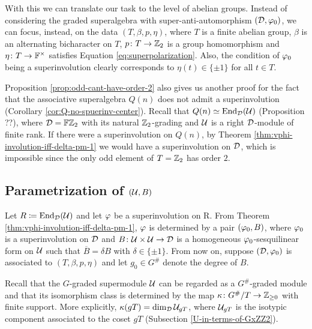 With this we can translate our task to the level of abelian groups. 
Instead of considering the graded superalgebra with super-anti-automorphism $(\mathcal{D}, \varphi_0)$, we can focus, instead, on the data $(T, \beta, p, \eta)$, where $T$ is a finite abelian group, $\beta$ is an alternating bicharacter on $T$, $p\colon T \to \mathbb{Z}_2$ is a group homomorphism and $\eta\colon T \to \mathbb{F}^\times$ satisfies Equation \eqref{eq:superpolarization}. 
Also, the condition of $\varphi_0$ being a superinvolution clearly corresponds to $\eta(t) \in \{ \pm 1 \}$ for all $t\in T$.



\begin{remark}
    Proposition \ref{prop:odd-cant-have-order-2} also gives us another proof for the fact that the associative superalgebra $Q(n)$ does not admit a superinvolution (Corollary \ref{cor:Q-no-spuerinv-center}). 
    Recall that $Q(n) \simeq \operatorname{End}_{\mathcal{D}} (\mathcal U)$ (Proposition ??), where $\mathcal{D}= \mathbb{F}\mathbb{Z}_2$ with its natural $\mathbb{Z}_2$-grading and $\mathcal U$ is a right $\mathcal{D}$-module of finite rank. 
    If there were a superinvolution on $Q(n)$, by Theorem \ref{thm:vphi-involution-iff-delta-pm-1} we would have a superinvolution on $\mathcal{D}$, which is impossible since the only odd element of $T = \mathbb{Z}_2$ has order $2$. 
\end{remark}


\subsection{Parametrization of $(\mathcal U, B)$}

Let $R \coloneqq \operatorname{End}_{\mathcal{D}} (\mathcal U)$ and let $\varphi$ be a superinvolution on R. 
From Theorem \ref{thm:vphi-involution-iff-delta-pm-1}, $\varphi$ is determined by a pair $(\varphi_0, B)$, where $\varphi_0$ is a superinvolution on $\mathcal{D}$ and $B\colon \mathcal U \times \mathcal U \to \mathcal{D}$ is a homogeneous $\varphi_0$-sesquilinear form on $\mathcal U$ such that $\overline B = \delta B$ with $\delta \in \{ \pm 1 \}$. 
From now on, suppose $(\mathcal{D}, \varphi_0)$ is associated to $(T, \beta, p, \eta)$ and let $g_0\in G^\#$ denote the degree of $B$. 

Recall that the $G$-graded supermodule $\mathcal U$ can be regarded as a $G^\#$-graded module 
and that its isomorphism class is determined by the map $\kappa\colon G^\#/T \to \mathbb{Z}_{\geq 0}$ with finite support. 
More explicitly, $\kappa (gT) = \dim_{\mathcal{D}} \mathcal U_{gT}$, where $\mathcal U_{gT}$ is the isotypic component associated to the coset $gT$ (Subsection \ref{U-in-terms-of-GxZZ2}).

